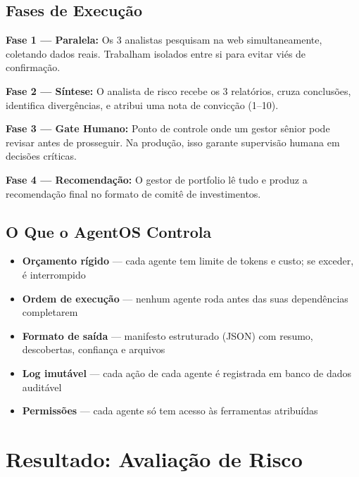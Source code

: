 \documentclass[11pt,a4paper]{article}
\begin{document}
\subsection{Fases de Execu\c{c}\~ao}

\textbf{Fase 1 --- Paralela:} Os 3 analistas pesquisam na web simultaneamente, coletando dados reais. Trabalham isolados entre si para evitar vi\'es de confirma\c{c}\~ao.

\textbf{Fase 2 --- S\'intese:} O analista de risco recebe os 3 relat\'orios, cruza conclus\~oes, identifica diverg\^encias, e atribui uma nota de convic\c{c}\~ao (1--10).

\textbf{Fase 3 --- Gate Humano:} Ponto de controle onde um gestor s\^enior pode revisar antes de prosseguir. Na produ\c{c}\~ao, isso garante supervis\~ao humana em decis\~oes cr\'iticas.

\textbf{Fase 4 --- Recomenda\c{c}\~ao:} O gestor de portfolio l\^e tudo e produz a recomenda\c{c}\~ao final no formato de comit\^e de investimentos.

\subsection{O Que o AgentOS Controla}

\begin{itemize}[nosep]
  \item \textbf{Or\c{c}amento r\'igido} --- cada agente tem limite de tokens e custo; se exceder, \'e interrompido
  \item \textbf{Ordem de execu\c{c}\~ao} --- nenhum agente roda antes das suas depend\^encias completarem
  \item \textbf{Formato de sa\'ida} --- manifesto estruturado (JSON) com resumo, descobertas, confian\c{c}a e arquivos
  \item \textbf{Log imut\'avel} --- cada a\c{c}\~ao de cada agente \'e registrada em banco de dados audit\'avel
  \item \textbf{Permiss\~oes} --- cada agente s\'o tem acesso \`as ferramentas atribu\'idas
\end{itemize}

\newpage


\section{Resultado: Avalia\c{c}\~ao de Risco}
\end{document}
